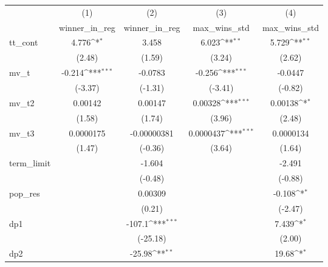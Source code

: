 {
\def\sym#1{\ifmmode^{#1}\else\(^{#1}\)\fi}
\begin{tabular}{l*{4}{c}}
\hline\hline
            &\multicolumn{1}{c}{(1)}&\multicolumn{1}{c}{(2)}&\multicolumn{1}{c}{(3)}&\multicolumn{1}{c}{(4)}\\
            &\multicolumn{1}{c}{winner\_in\_reg}&\multicolumn{1}{c}{winner\_in\_reg}&\multicolumn{1}{c}{max\_wins\_std}&\multicolumn{1}{c}{max\_wins\_std}\\
\hline
tt\_cont     &       4.776\sym{*}  &       3.458         &       6.023\sym{**} &       5.729\sym{**} \\
            &      (2.48)         &      (1.59)         &      (3.24)         &      (2.62)         \\
[1em]
mv\_t        &      -0.214\sym{***}&     -0.0783         &      -0.256\sym{***}&     -0.0447         \\
            &     (-3.37)         &     (-1.31)         &     (-3.41)         &     (-0.82)         \\
[1em]
mv\_t2       &     0.00142         &     0.00147         &     0.00328\sym{***}&     0.00138\sym{*}  \\
            &      (1.58)         &      (1.74)         &      (3.96)         &      (2.48)         \\
[1em]
mv\_t3       &   0.0000175         & -0.00000381         &   0.0000437\sym{***}&   0.0000134         \\
            &      (1.47)         &     (-0.36)         &      (3.64)         &      (1.64)         \\
[1em]
term\_limit  &                     &      -1.604         &                     &      -2.491         \\
            &                     &     (-0.48)         &                     &     (-0.88)         \\
[1em]
pop\_res     &                     &     0.00309         &                     &      -0.108\sym{*}  \\
            &                     &      (0.21)         &                     &     (-2.47)         \\
[1em]
dp1         &                     &      -107.1\sym{***}&                     &       7.439\sym{*}  \\
            &                     &    (-25.18)         &                     &      (2.00)         \\
[1em]
dp2         &                     &      -25.98\sym{**} &                     &       19.68\sym{*}  \\

\end{tabular}}
